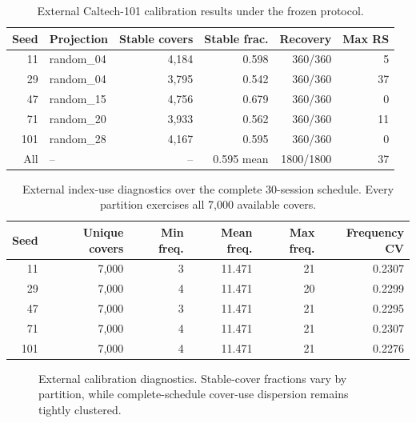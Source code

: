 \begin{table}[t]
\caption{External Caltech-101 calibration results under the frozen protocol.}
\label{tab:calibration}
\small
\begin{tabular}{@{}rlrrrr@{}}
\toprule
Seed & Projection & Stable covers & Stable frac. & Recovery & Max RS \\
\midrule
11  & random\_04 & 4,184 & 0.598 & 360/360 & 5 \\
29  & random\_04 & 3,795 & 0.542 & 360/360 & 37 \\
47  & random\_15 & 4,756 & 0.679 & 360/360 & 0 \\
71  & random\_20 & 3,933 & 0.562 & 360/360 & 11 \\
101 & random\_28 & 4,167 & 0.595 & 360/360 & 0 \\
\midrule
All & -- & -- & 0.595 mean & 1800/1800 & 37 \\
\bottomrule
\end{tabular}
\end{table}

\begin{table}[t]
\caption{External index-use diagnostics over the complete 30-session schedule. Every partition exercises all 7,000 available covers.}
\label{tab:index-use}
\small
\begin{tabular}{@{}rrrrrr@{}}
\toprule
Seed & Unique covers & Min freq. & Mean freq. & Max freq. & Frequency CV \\
\midrule
11  & 7,000 & 3 & 11.471 & 21 & 0.2307 \\
29  & 7,000 & 4 & 11.471 & 20 & 0.2299 \\
47  & 7,000 & 3 & 11.471 & 21 & 0.2295 \\
71  & 7,000 & 4 & 11.471 & 21 & 0.2307 \\
101 & 7,000 & 4 & 11.471 & 21 & 0.2276 \\
\bottomrule
\end{tabular}
\end{table}

\begin{figure}[t]
\centering
{}
\caption{External calibration diagnostics. Stable-cover fractions vary by partition, while complete-schedule cover-use dispersion remains tightly clustered.}
\label{fig:calibration-diagnostics}
\end{figure}

